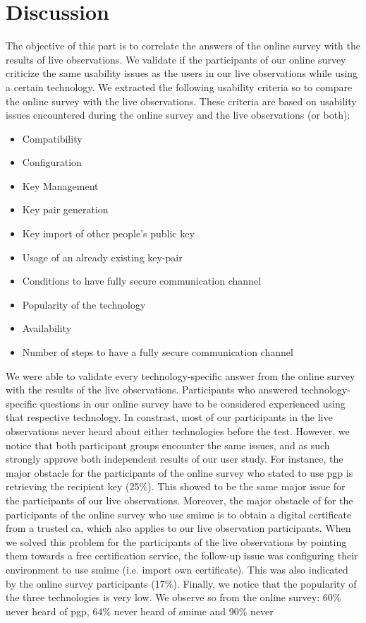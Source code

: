 \section{Discussion}
The objective of this part is to correlate the answers of the online survey with the results of live observations. We validate if the participants of our online survey criticize the same usability issues as the users in our live observations while using a certain technology. We extracted the following usability criteria so to compare the online survey with the live observations. These criteria are based on usability issues encountered during the online survey and the live observations (or both):
\begin{itemize}
	\item Compatibility
	\item Configuration
	\item Key Management
	\item Key pair generation
	\item Key import of other people’s public key
	\item Usage of an already existing key-pair
	\item Conditions to have fully secure communication channel
	\item Popularity of the technology
	\item Availability
	\item Number of steps to have a fully secure communication channel
\end{itemize}
We were able to validate every technology-specific answer from the online survey with the results of the live observations. Participants who answered technology-specific questions in our online survey have to be considered experienced using that respective technology. In constrast, most of our participants in the live observations never heard about either technologies before the test. However, we notice that both participant groups encounter the same issues, and as such strongly approve both independent results of our user study. For instance, the major obstacle for the participants of the online survey who stated to use \acrshort{pgp} is retrieving the recipient key (25\%). This showed to be the same major issue for the participants of our live observations. Moreover, the major obstacle of for the participants of the online survey who use \acrshort{smime} is to obtain a digital certificate from a trusted \acrlong{ca}, which also applies to our live observation participants. When we solved this problem for the participants of the live observations by pointing them towards a free certification service, the follow-up issue was configuring their environment to use \acrshort{smime} (i.e. import own certificate). This was also indicated by the online survey participants (17\%). Finally, we notice that the popularity of the three technologies is very low. We observe so from the online survey: 60\% never heard of \acrshort{pgp}, 64\% never heard of \acrshort{smime} and 90\% never
